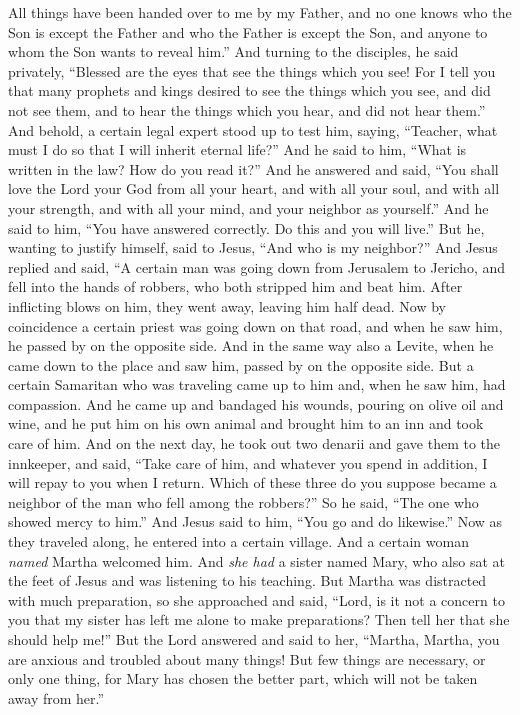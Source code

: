\begin{biblechapter}
\verse All things have been handed over to me by my Father, and no one knows who the Son is except the Father and who the Father is except the Son, and anyone to whom the Son wants to reveal him.”
\verse And turning to the disciples, he said privately, “Blessed are the eyes that see the things which you see!
\verse For I tell you that many prophets and kings desired to see the things which you see, and did not see them, and to hear the things which you hear, and did not hear them.”
 And behold, a certain legal expert stood up to test him, saying, “Teacher, what must I do so that I will inherit eternal life?”
\verse And he said to him, “What is written in the law? How do you read it?”
\verse And he answered and said, “You shall love the Lord your God from all your heart, and with all your soul, and with all your strength, and with all your mind, and your neighbor as yourself.”
\verse And he said to him, “You have answered correctly. Do this and you will live.”
\verse But he, wanting to justify himself, said to Jesus, “And who is my neighbor?”
\verse And Jesus replied and said, “A certain man was going down from Jerusalem to Jericho, and fell into the hands of robbers, who both stripped him and beat him. After inflicting blows on him, they went away, leaving him half dead.
\verse Now by coincidence a certain priest was going down on that road, and when he saw him, he passed by on the opposite side.
\verse And in the same way also a Levite, when he came down to the place and saw him, passed by on the opposite side.
\verse But a certain Samaritan who was traveling came up to him and, when he saw him, had compassion.
\verse And he came up and bandaged his wounds, pouring on olive oil and wine, and he put him on his own animal and brought him to an inn and took care of him.
\verse And on the next day, he took out two denarii and gave them﻿ to the innkeeper, and said, “Take care of him, and whatever you spend in addition, I will repay to you when I return.
\verse Which of these three do you suppose became a neighbor of the man who fell among the robbers?”
\verse So he said, “The one who showed mercy to him.” And Jesus said to him, “You go and do likewise.”
 Now as they traveled along, he entered into a certain village. And a certain woman \textit{named} Martha welcomed him.
\verse And \textit{she had} a sister named Mary, who also sat at the feet of Jesus and was listening to his teaching.
\verse But Martha was distracted with much preparation, so she approached and said, “Lord, is it not a concern to you that my sister has left me alone to make preparations? Then tell her that she should help me!”
\verse But the Lord answered and said to her, “Martha, Martha, you are anxious and troubled about many things!
\verse But few things are necessary, or only one thing, for Mary has chosen the better part, which will not be taken away from her.”
\end{biblechapter}

